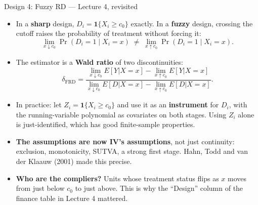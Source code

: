 \documentclass[
  11pt,
  ignorenonframetext,
  aspectratio=169,
]{beamer}
\providecommand{\tightlist}{%
  \setlength{\itemsep}{0pt}\setlength{\parskip}{0pt}}
\begin{document}
\begin{frame}{Design 4: Fuzzy RD --- Lecture 4, revisited}
\protect{}\label{design-4-fuzzy-rd-lecture-4-revisited}
\begin{itemize}
\tightlist
\item
  In a \textbf{sharp} design, \(D_i = \mathbf{1}\{X_i \geq c_0\}\)
  exactly. In a \textbf{fuzzy} design, crossing the cutoff raises the
  probability of treatment without forcing it: \[
  \lim_{x \downarrow c_0} \Pr(D_i = 1 \mid X_i = x) \;\neq\; \lim_{x \uparrow c_0} \Pr(D_i = 1 \mid X_i = x).
  \]
\item
  The estimator is a \textbf{Wald ratio} of two discontinuities: \[
  \delta_{\text{FRD}} = \frac{\lim_{x\downarrow c_0} E[Y|X=x] - \lim_{x\uparrow c_0} E[Y|X=x]}
                           {\lim_{x\downarrow c_0} E[D|X=x] - \lim_{x\uparrow c_0} E[D|X=x]} .
  \]
\item
  In practice: let \(Z_i = \mathbf{1}\{X_i \geq c_0\}\) and use it as an
  \textbf{instrument} for \(D_i\), with the running-variable polynomial
  as covariates on both stages. Using \(Z_i\) alone is just-identified,
  which has good finite-sample properties.
\item
  \textbf{The assumptions are now IV's assumptions}, not just
  continuity: exclusion, monotonicity, SUTVA, a strong first stage.
  Hahn, Todd and van der Klaauw (2001) made this precise.
\item
  \textbf{Who are the compliers?} Units whose treatment status flips as
  \(x\) moves from just below \(c_0\) to just above. This is why the
  ``Design'' column of the finance table in Lecture 4 mattered.
\end{itemize}
\end{frame}
\end{document}
